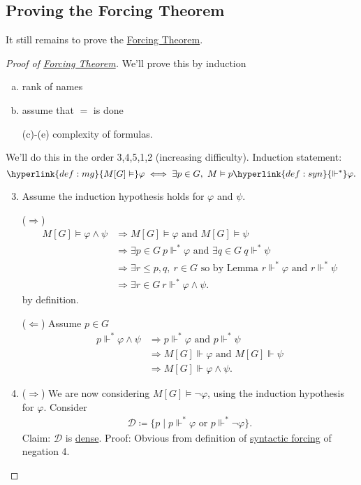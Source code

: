 \documentclass{article}
\newcommand{\1}{\mathbbm{1}}
\let\models\vDash
\let\forces\Vdash
\begin{document}
\subsection{Proving the Forcing Theorem}
It still remains to prove the \hyperlink{thm:forcing}{Forcing Theorem}.
\begin{proof}[Proof of \hyperlink{thm:forcing}{Forcing Theorem}]
  We'll prove this by induction
  \begin{enumerate}[(a)]
    \item rank of names
    \item assume that $=$ is done
    \item[(c)-(e)] complexity of formulas.
  \end{enumerate}
  We'll do this in the order 3,4,5,1,2 (increasing difficulty).
  Induction statement:
  \begin{equation*}
    \hyperlink{def:mg}{M[G] \models} \varphi \iff \exists p \in G, \ M \models p \hyperlink{def:syn}{\Vdash^*} \varphi.
  \end{equation*}
  \begin{enumerate}\setcounter{enumi}{2}
    \item
      Assume the induction hypothesis holds for $\varphi$ and $\psi$.

      ($\Rightarrow$)
      \begin{align*}
        M[G] \models \varphi \land \psi &\Rightarrow M[G]  \models \varphi \text{ and } M[G] \models \psi \\
                                        &\Rightarrow \exists p \in G \ p \Vdash^* \varphi \text{ and } \exists q \in G \ q \Vdash^* \psi \\
                                        &\Rightarrow \exists r \leq p,q,\ r \in G \text{ so by Lemma } r \Vdash^* \varphi \text{ and } r \Vdash^* \psi \\
                                        &\Rightarrow \exists r \in G\ r \Vdash^* \varphi \land \psi.
      \end{align*}
      by definition.

      ($\Leftarrow$) Assume $p \in G$
      \begin{align*}
        p \forces^* \varphi \land \psi &\Rightarrow p \forces^* \varphi \text{ and } p \Vdash^* \psi \\
                                       &\Rightarrow M[G] \forces \varphi \text{ and } M[G] \forces \psi \\
                                       &\Rightarrow M[G] \forces \varphi \land \psi.
      \end{align*}
    \item ($\Rightarrow$) We are now considering $M[G] \models \neg\varphi$, using the induction hypothesis for $\varphi$. Consider
      \begin{align*}
        \mathcal{D} \coloneqq \{p \mid p \forces^* \varphi \text{ or } p \forces^* \neg \varphi \}.
      \end{align*}
      Claim: $\mathcal{D}$ is \hyperlink{def:dense}{dense}. Proof: Obvious from definition of \hyperlink{def:syn}{syntactic forcing} of negation 4.


\end{enumerate}
\end{proof}
\end{document}
